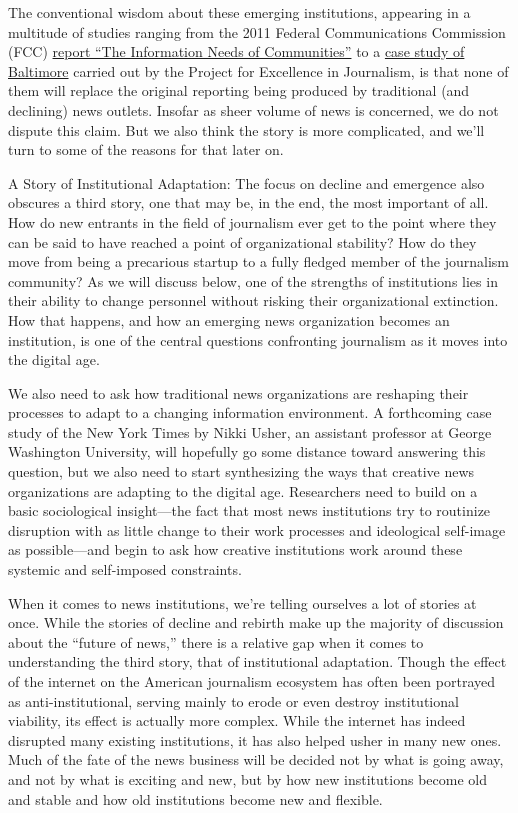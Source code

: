 The conventional wisdom about these emerging institutions, appearing
in a multitude of studies ranging from the 2011 Federal Communications
Commission (FCC) \href{http://www.fcc.gov/info-needs-communities}{report ``The Information Needs of Communities''}
to a \href{http://www.journalism.org/analysis_report/how_news_happens}{case study of Baltimore} carried out by the Project for
Excellence in Journalism, is that none of them will replace the original reporting being produced by traditional (and declining) news outlets.
Insofar as sheer volume of news is concerned, we do not dispute this
claim. But we also think the story is more complicated, and we’ll turn
to some of the reasons for that later on.

A Story of Institutional Adaptation: The focus on decline and emergence
also obscures a third story, one that may be, in the end, the most important
of all. How do new entrants in the field of journalism ever get to
the point where they can be said to have reached a point of organizational
stability? How do they move from being a precarious startup to a
fully fledged member of the journalism community? As we will discuss
below, one of the strengths of institutions lies in their ability to change
personnel without risking their organizational extinction. How that
happens, and how an emerging news organization becomes an institution,
is one of the central questions confronting journalism as it moves
into the digital age.

We also need to ask how traditional news organizations are reshaping
their processes to adapt to a changing information environment.
A forthcoming case study of the New York Times by Nikki Usher,
an assistant professor at George Washington University, will hopefully
go some distance toward answering this question, but we also need to
start synthesizing the ways that creative news organizations are adapting
to the digital age. Researchers need to build on a basic sociological
insight—the fact that most news institutions try to routinize disruption
with as little change to their work processes and ideological self-image
as possible—and begin to ask how creative institutions work around
these systemic and self-imposed constraints.

When it comes to news institutions, we’re telling ourselves a lot of stories at
once. While the stories of decline and rebirth make up the majority of discussion
about the ``future of news,'' there is a relative gap when it comes to understanding
the third story, that of institutional adaptation. Though the effect of
the internet on the American journalism ecosystem has often been portrayed as
anti-institutional, serving mainly to erode or even destroy institutional viability,
its effect is actually more complex. While the internet has indeed disrupted many existing institutions, it has also helped usher in many new ones. Much of the fate
of the news business will be decided not by what is going away, and not by what
is exciting and new, but by how new institutions become old and stable and how
old institutions become new and flexible.

